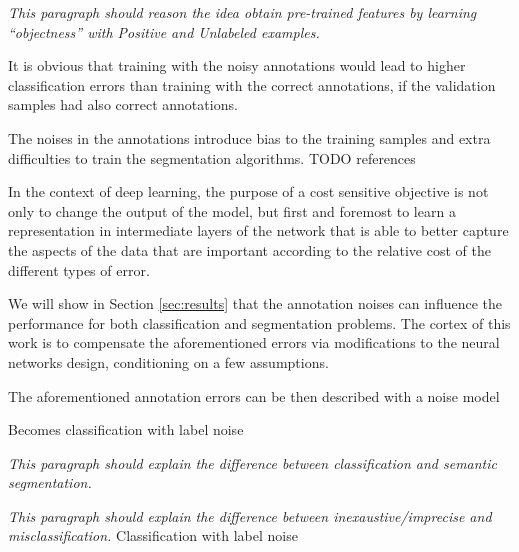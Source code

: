 \noindent
\textit{This paragraph should reason the idea obtain pre-trained features by learning ``objectness'' with Positive and Unlabeled examples.}

\noindent
It is obvious that training with the noisy annotations would lead to higher classification errors than training with the correct annotations, if the validation samples had also correct annotations.

The noises in the annotations introduce bias to the training samples and extra difficulties to train the segmentation algorithms. {TODO references}

In the context of deep learning, the purpose of a cost sensitive objective is
not only to change the output of the model, but first and foremost to learn a representation in intermediate layers of the network that is able to better capture the aspects of the data that are important according to the relative cost of the different types of error.

We will show in Section \ref{sec:results} that the annotation noises can influence the performance for both classification and segmentation problems.
The cortex of this work is to compensate the aforementioned errors via modifications to the neural networks design, conditioning on a few assumptions.



The aforementioned annotation errors can be then described with a noise model

Becomes classification with label noise


\textit{This paragraph should explain the difference between classification and semantic segmentation.}

\textit{This paragraph should explain the difference between inexaustive/imprecise and misclassification.}
Classification with label noise


